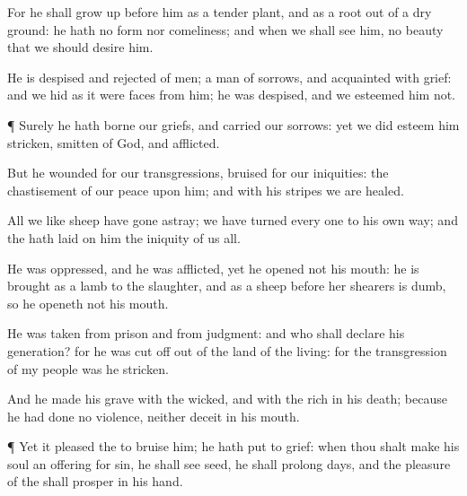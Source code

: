 {For he shall grow
up
before him as a tender
plant, and as a
root out of a
dry
ground: he hath no
form nor
comeliness; and when we shall
see him,
{} no
beauty that we should
desire him.

He is
despised and
rejected of
men; a
man of
sorrows, and
acquainted with
grief: and we hid as it
were
{}
faces from him; he was
despised, and we
esteemed him not.


\par }{\PP {}¶
Surely he hath
borne our
griefs, and
carried our
sorrows: yet we did
esteem him
stricken,
smitten of
God, and
afflicted.

But he
{}
wounded for our
transgressions,
{}
bruised for our
iniquities: the
chastisement of our
peace
{} upon him; and with his
stripes we are
healed.

All we like
sheep have gone
astray; we have
turned every
one to his own
way; and the
{} hath
laid on him the
iniquity of us all.

He was
oppressed, and he was
afflicted, yet he
opened not his
mouth: he is
brought as a
lamb to the
slaughter, and as a
sheep
before her
shearers is
dumb, so he
openeth not his
mouth.

He was
taken from
prison and from
judgment: and who shall
declare his
generation? for he was cut
off out of the
land of the
living: for the
transgression of my
people was he
stricken.

And he
made his
grave with the
wicked, and with the
rich in his
death; because he had
done no
violence, neither
{}
deceit in his
mouth.


\par }{\PP {}¶ Yet it
pleased the
{} to
bruise him; he hath put
{} to
grief: when thou shalt
make his
soul an offering for
sin, he shall
see
{}
seed, he shall
prolong
{}
days, and the
pleasure of the
{} shall
prosper in his
hand.

}
